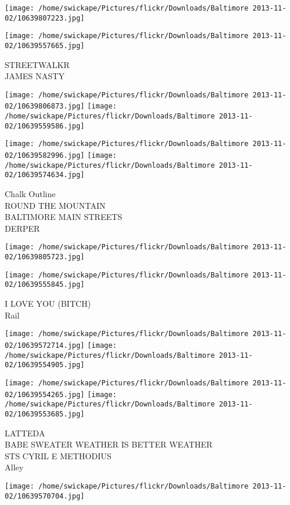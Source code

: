\documentclass[10pt,letterpaper]{article}
\begin{document}
\texttt{[image: /home/swickape/Pictures/flickr/Downloads/Baltimore 2013-11-02/10639807223.jpg]}

\vspace{0.25in}
\texttt{[image: /home/swickape/Pictures/flickr/Downloads/Baltimore 2013-11-02/10639557665.jpg]}

STREETWALKR\\
JAMES NASTY
\pagebreak

\texttt{[image: /home/swickape/Pictures/flickr/Downloads/Baltimore 2013-11-02/10639806873.jpg]}
\texttt{[image: /home/swickape/Pictures/flickr/Downloads/Baltimore 2013-11-02/10639559586.jpg]}

\texttt{[image: /home/swickape/Pictures/flickr/Downloads/Baltimore 2013-11-02/10639582996.jpg]}
\texttt{[image: /home/swickape/Pictures/flickr/Downloads/Baltimore 2013-11-02/10639574634.jpg]}

Chalk Outline\\
ROUND THE MOUNTAIN\\
BALTIMORE MAIN STREETS\\
DERPER
\pagebreak

\texttt{[image: /home/swickape/Pictures/flickr/Downloads/Baltimore 2013-11-02/10639805723.jpg]}

\vspace{0.25in}
\texttt{[image: /home/swickape/Pictures/flickr/Downloads/Baltimore 2013-11-02/10639555845.jpg]}

I LOVE YOU (BITCH)\\
Rail
\pagebreak

\texttt{[image: /home/swickape/Pictures/flickr/Downloads/Baltimore 2013-11-02/10639572714.jpg]}
\texttt{[image: /home/swickape/Pictures/flickr/Downloads/Baltimore 2013-11-02/10639554905.jpg]}

\texttt{[image: /home/swickape/Pictures/flickr/Downloads/Baltimore 2013-11-02/10639554265.jpg]}
\texttt{[image: /home/swickape/Pictures/flickr/Downloads/Baltimore 2013-11-02/10639553685.jpg]}

LATTEDA\\
BABE SWEATER WEATHER IS BETTER WEATHER\\
STS CYRIL E METHODIUS\\
Alley
\pagebreak

\texttt{[image: /home/swickape/Pictures/flickr/Downloads/Baltimore 2013-11-02/10639570704.jpg]}
\end{document}
